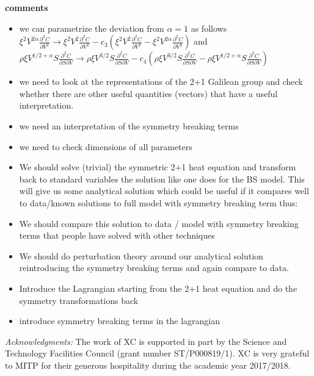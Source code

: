 \documentclass[english,12pt]{article}
\def\to{\rightarrow}
\begin{document}
{\bf comments}

\begin{itemize}
\item we can parametrize the deviation from $\alpha=1$ as follows
$\xi^2 V^{2 \alpha}  \frac{\partial^2 C}{\partial V^2}\to\xi^2 V^{2}  \frac{\partial^2 C}{\partial V^2}- c_3 (\xi^2 V^{2}  \frac{\partial^2 C}{\partial V^2}-\xi^2 V^{2 \alpha}  \frac{\partial^2 C}{\partial V^2}) $ and $\rho \xi V^{1/2+\alpha} S \frac{\partial^2 C}{\partial S \partial V}\to \rho \xi V^{3/2} S \frac{\partial^2 C}{\partial S \partial V} 
- c_4(\rho \xi V^{3/2} S \frac{\partial^2 C}{\partial S \partial V} -
\rho \xi V^{1/2+\alpha} S \frac{\partial^2 C}{\partial S \partial V}) $ 
\item we need to look at the representations of the 2+1 Galilean group and check whether there are other useful quantities (vectors) that have a useful interpretation.
\item we need an interpretation of the symmetry breaking terms
\item we need to check dimensions of all parameters
\item We should solve (trivial) the symmetric 2+1 heat equation and transform back to standard variables the solution like one does for the BS model. This will give us some analytical solution which could be useful if it compares well to data/known solutions to full model with symmetry breaking term thus:
\item We should compare this solution to data / model with symmetry breaking terms that people have solved with other techniques
\item We should do perturbation theory around our analytical solution reintroducing the symmetry breaking terms and again compare to data.
\item Introduce the Lagrangian starting from the 2+1 heat equation and do the symmetry transformations back
\item introduce symmetry breaking terms in the lagrangian
\end{itemize}












{\it Acknowledgments:}
The work of XC is supported in part  by the Science and Technology Facilities Council (grant number  ST/P000819/1). XC is very grateful to MITP for their generous hospitality during the academic year 2017/2018. 



\bigskip{}


\baselineskip=1.6pt 

\begin{thebibliography}{10}

   
\end{thebibliography}
\end{document}
